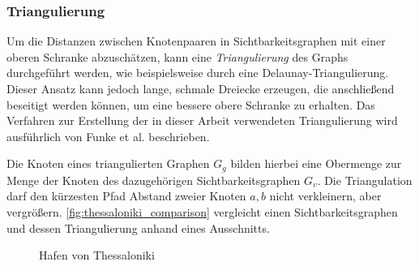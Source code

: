 \subsubsection{Triangulierung}

Um die Distanzen zwischen Knotenpaaren in Sichtbarkeitsgraphen mit einer oberen Schranke abzuschätzen, kann eine \emph{Triangulierung} des Graphs durchgeführt werden, wie beispielsweise durch eine Delaunay-Triangulierung.
Dieser Ansatz kann jedoch lange, schmale Dreiecke erzeugen, die anschließend beseitigt werden können, um eine bessere obere Schranke zu erhalten.
Das Verfahren zur Erstellung der in dieser Arbeit verwendeten Triangulierung wird ausführlich von Funke et al. \cite{funkescalable} beschrieben.

Die Knoten eines triangulierten Graphen $G_g$ bilden hierbei eine Obermenge zur Menge der Knoten des dazugehörigen Sichtbarkeitsgraphen $G_v$.
Die Triangulation darf den kürzesten Pfad Abstand zweier Knoten $a, b$ nicht verkleinern, aber vergrößern.
\autoref{fig:thessaloniki_comparison} vergleicht einen Sichtbarkeitsgraphen und dessen Triangulierung anhand eines Ausschnitts.

\begin{figure}[h!]%
  \centering
  \caption{Hafen von Thessaloniki}%
  \label{fig:thessaloniki_comparison}%
\end{figure}
